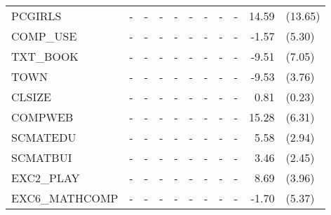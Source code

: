 \documentclass[10pt]{article}
\begin{document}
\begin{table}[htbp]
\begin{tabular}{lrlrlrlrlrl}
     	PCGIRLS & \multicolumn{1}{c}{-} & \multicolumn{1}{c}{-} & \multicolumn{1}{c}{-} & \multicolumn{1}{c}{-} & \multicolumn{1}{c}{-} & \multicolumn{1}{c}{-} & \multicolumn{1}{c}{-} & \multicolumn{1}{c}{-} & 14.59 & (13.65) \\[0.2em]
     	COMP\_USE & \multicolumn{1}{c}{-} & \multicolumn{1}{c}{-} & \multicolumn{1}{c}{-} & \multicolumn{1}{c}{-} & \multicolumn{1}{c}{-} & \multicolumn{1}{c}{-} & \multicolumn{1}{c}{-} & \multicolumn{1}{c}{-} & -1.57 & (5.30) \\[0.2em]
     	TXT\_BOOK & \multicolumn{1}{c}{-} & \multicolumn{1}{c}{-} & \multicolumn{1}{c}{-} & \multicolumn{1}{c}{-} & \multicolumn{1}{c}{-} & \multicolumn{1}{c}{-} & \multicolumn{1}{c}{-} & \multicolumn{1}{c}{-} & -9.51 & (7.05) \\[0.2em]
     	TOWN  & \multicolumn{1}{c}{-} & \multicolumn{1}{c}{-} & \multicolumn{1}{c}{-} & \multicolumn{1}{c}{-} & \multicolumn{1}{c}{-} & \multicolumn{1}{c}{-} & \multicolumn{1}{c}{-} & \multicolumn{1}{c}{-} & -9.53 & (3.76) \\[0.2em]
     	CLSIZE & \multicolumn{1}{c}{-} & \multicolumn{1}{c}{-} & \multicolumn{1}{c}{-} & \multicolumn{1}{c}{-} & \multicolumn{1}{c}{-} & \multicolumn{1}{c}{-} & \multicolumn{1}{c}{-} & \multicolumn{1}{c}{-} & 0.81  & (0.23) \\[0.2em]
     	COMPWEB & \multicolumn{1}{c}{-} & \multicolumn{1}{c}{-} & \multicolumn{1}{c}{-} & \multicolumn{1}{c}{-} & \multicolumn{1}{c}{-} & \multicolumn{1}{c}{-} & \multicolumn{1}{c}{-} & \multicolumn{1}{c}{-} & 15.28 & (6.31) \\[0.2em]
     	SCMATEDU & \multicolumn{1}{c}{-} & \multicolumn{1}{c}{-} & \multicolumn{1}{c}{-} & \multicolumn{1}{c}{-} & \multicolumn{1}{c}{-} & \multicolumn{1}{c}{-} & \multicolumn{1}{c}{-} & \multicolumn{1}{c}{-} & 5.58  & (2.94) \\[0.2em]
     	SCMATBUI & \multicolumn{1}{c}{-} & \multicolumn{1}{c}{-} & \multicolumn{1}{c}{-} & \multicolumn{1}{c}{-} & \multicolumn{1}{c}{-} & \multicolumn{1}{c}{-} & \multicolumn{1}{c}{-} & \multicolumn{1}{c}{-} & 3.46  & (2.45) \\[0.2em]
     	EXC2\_PLAY & \multicolumn{1}{c}{-} & \multicolumn{1}{c}{-} & \multicolumn{1}{c}{-} & \multicolumn{1}{c}{-} & \multicolumn{1}{c}{-} & \multicolumn{1}{c}{-} & \multicolumn{1}{c}{-} & \multicolumn{1}{c}{-} & 8.69  & (3.96) \\[0.2em]
     	EXC6\_MATHCOMP & \multicolumn{1}{c}{-} & \multicolumn{1}{c}{-} & \multicolumn{1}{c}{-} & \multicolumn{1}{c}{-} & \multicolumn{1}{c}{-} & \multicolumn{1}{c}{-} & \multicolumn{1}{c}{-} & \multicolumn{1}{c}{-} & -1.70 & (5.37) \\[0.2em]

\end{tabular}
\end{table}
\end{document}
